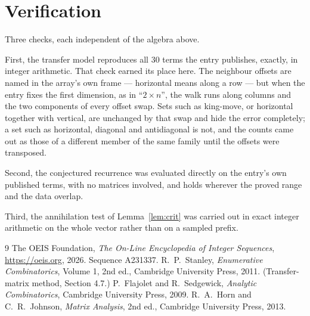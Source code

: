 \documentclass[11pt,a4paper]{article}
\theoremstyle{plain}
\theoremstyle{definition}
\begin{document}
\section{Verification}

Three checks, each independent of the algebra above.

First, the transfer model reproduces all $30$ terms the entry publishes, exactly, in
integer arithmetic. That check earned its place here. The neighbour offsets are named in the
array's own frame --- horizontal means along a row --- but when the entry fixes the first
dimension, as in ``$2\times n$'', the walk runs along columns and the two components of every
offset swap. Sets such as king-move, or horizontal together with vertical, are unchanged by
that swap and hide the error completely; a set such as horizontal, diagonal and antidiagonal
is not, and the counts came out as those of a different member of the same family until the
offsets were transposed.

Second, the conjectured recurrence was evaluated directly on the entry's own published terms,
with no matrices involved, and holds wherever the proved range and the data overlap.

Third, the annihilation test of Lemma~\ref{lem:crit} was carried out in exact integer
arithmetic on the whole vector rather than on a sampled prefix.

\begin{thebibliography}{9}
 The OEIS Foundation, \emph{The On-Line Encyclopedia of Integer
Sequences}, \url{https://oeis.org}, 2026. Sequence A231337.
 R.~P.~Stanley, \emph{Enumerative Combinatorics}, Volume 1, 2nd ed.,
Cambridge University Press, 2011. (Transfer-matrix method, Section 4.7.)
 P.~Flajolet and R.~Sedgewick, \emph{Analytic Combinatorics}, Cambridge
University Press, 2009.
 R.~A.~Horn and C.~R.~Johnson, \emph{Matrix Analysis}, 2nd ed., Cambridge
University Press, 2013.
\end{thebibliography}
\end{document}
